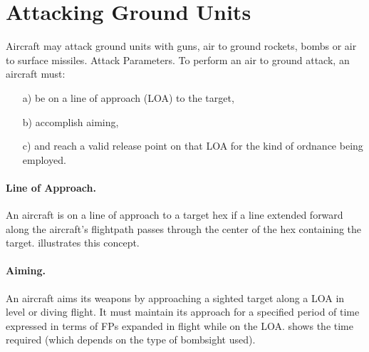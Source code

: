 \section{Attacking Ground Units}

Aircraft may attack ground units with guns, air to ground rockets, bombs or air to surface missiles.
Attack Parameters. To perform an air to ground attack, an aircraft must:
\begin{enumerate}
    \item[a)] be on a line of approach (LOA) to the target,
    \item[b)] accomplish aiming,
    \item[c)] and reach a valid release point on that LOA for the kind of ordnance being employed.
\end{enumerate}

\paragraph{Line of Approach.} An aircraft is on a line of approach to a target hex if a line extended forward along the aircraft's flightpath passes through the center of the hex containing the target.  illustrates this concept. 




\paragraph{Aiming.} An aircraft aims its weapons by approaching a sighted target along a LOA in level or diving flight. It must maintain its approach for a specified period of time expressed in terms of FPs expanded in flight while on the LOA.  shows the time required (which depends on the type of bombsight used).

